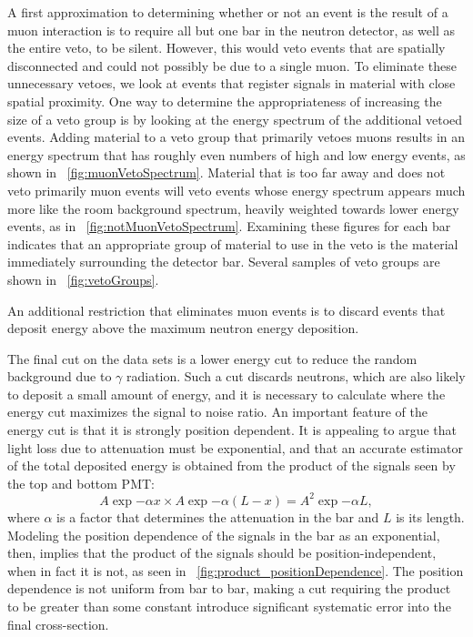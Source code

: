 A first approximation to determining whether or not an event is the result of a muon interaction is to require all but one bar in the neutron detector, as well as the entire veto, to be silent.  However, this would veto events that are spatially disconnected and could not possibly be due to a single muon.  To eliminate these unnecessary vetoes, we look at events that register signals in material with close spatial proximity.  One way to determine the appropriateness of increasing the size of a veto group is by looking at the energy spectrum of the additional vetoed events.  Adding material to a veto group that primarily vetoes muons results in an energy spectrum that has roughly even numbers of high and low energy events, as shown in {\fig}~\ref{fig:muonVetoSpectrum}.  Material that is too far away and does not veto primarily muon events will veto events whose energy spectrum appears much more like the room background spectrum, heavily weighted towards lower energy events, as in {\fig}~\ref{fig:notMuonVetoSpectrum}.  Examining these figures for each bar indicates that an appropriate group of material to use in the veto is the material immediately surrounding the detector bar.  Several samples of veto groups are shown in {\fig}~\ref{fig:vetoGroups}.

An additional restriction that eliminates muon events is to discard events that deposit energy above the maximum neutron energy deposition.    

The final cut on the data sets is a lower energy cut to reduce the random background due to $\gamma$ radiation.  Such a cut discards neutrons, which are also likely to deposit a small amount of energy, and it is necessary to calculate where the energy cut maximizes the signal to noise ratio.  An important feature of the energy cut is that it is strongly position dependent.  It is appealing to argue that light loss due to attenuation must be exponential, and that an accurate estimator of the total deposited energy is obtained from the product of the signals seen by the top and bottom PMT:
\begin{equation}
A\exp{-\alpha x}\times A\exp{-\alpha (L-x)} = A^2\exp{-\alpha L},
\end{equation}
where $\alpha$ is a factor that determines the attenuation in the bar and $L$ is its length.  Modeling the position dependence of the signals in the bar as an exponential, then, implies that the product of the signals should be position-independent, when in fact it is not, as seen in {\fig}~\ref{fig:product_positionDependence}.  The position dependence is not uniform from bar to bar, making a cut requiring the product to be greater than some constant introduce significant systematic error into the final cross-section.

